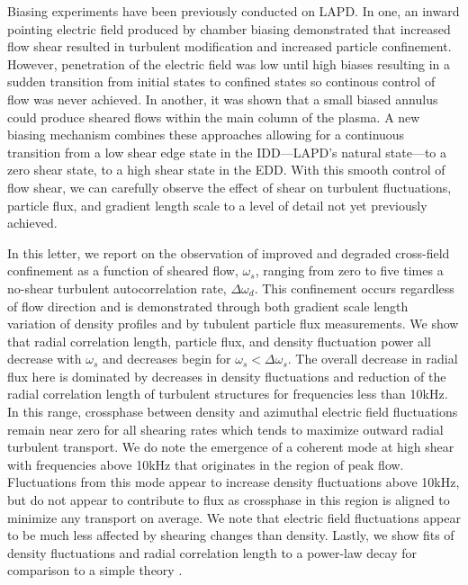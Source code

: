 \documentclass[aps,prl,amsmath,amssymb,preprint,superscriptaddress]{revtex4}
\begin{document}
Biasing experiments have been previously conducted on LAPD. In one, an inward pointing electric field produced by chamber biasing demonstrated that increased flow shear resulted in turbulent modification and increased particle confinement\cite{carter09}. However, penetration of the electric field was low until high biases resulting in a sudden transition from initial states to confined states so continous control of flow was never achieved. In another, it was shown that a small biased annulus could produce sheared flows within the main column of the plasma\cite{zhou12}. A new biasing mechanism combines these approaches allowing for a continuous transition from a low shear edge state in the IDD---LAPD's natural state---to a zero shear state, to a high shear state in the EDD. With this smooth control of flow shear, we can carefully observe the effect of shear on turbulent fluctuations, particle flux, and gradient length scale to a level of detail not yet previously achieved.

In this letter, we report on the observation of improved and degraded cross-field confinement as a function of sheared flow, $\omega_{s}$, ranging from zero to five times a no-shear turbulent autocorrelation rate, $\Delta \omega_{d}$. This confinement occurs regardless of flow direction and is demonstrated through both gradient scale length variation of density profiles and by tubulent particle flux measurements. We show that radial correlation length, particle flux, and density fluctuation power all decrease with $\omega_{s}$ and decreases begin for $\omega_{s} < \Delta \omega_{s}$. The overall decrease in radial flux here is dominated by decreases in density fluctuations and reduction of the radial correlation length of turbulent structures for frequencies less than 10kHz. In this range, crossphase between density and azimuthal electric field fluctuations remain near zero for all shearing rates which tends to maximize outward radial turbulent transport. We do note the emergence of a coherent mode at high shear with frequencies above 10kHz that originates in the region of peak flow. Fluctuations from this mode appear to increase density fluctuations above 10kHz, but do not appear to contribute to flux as crossphase in this region is aligned to minimize any transport on average. We note that electric field fluctuations appear to be much less affected by shearing changes than density. Lastly, we show fits of density fluctuations and radial correlation length to a power-law decay for comparison to a simple theory \cite{biglari90}.
\end{document}
